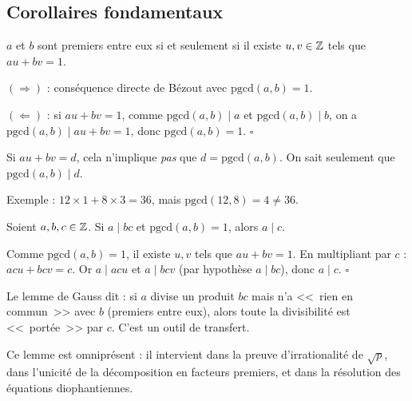 \subsection{Corollaires fondamentaux}

\begin{corollaire}
$a$ et $b$ sont premiers entre eux si et seulement si il existe $u, v \in \mathbb{Z}$ tels que $au + bv = 1$.
\end{corollaire}

\begin{proofbox}
$(\Rightarrow)$ : conséquence directe de Bézout avec $\text{pgcd}(a,b) = 1$.

$(\Leftarrow)$ : si $au + bv = 1$, comme $\text{pgcd}(a,b) \mid a$ et $\text{pgcd}(a,b) \mid b$, on a $\text{pgcd}(a,b) \mid au + bv = 1$, donc $\text{pgcd}(a,b) = 1$. \hfill$\square$
\end{proofbox}

\begin{rembox}
Si $au + bv = d$, cela n'implique \emph{pas} que $d = \text{pgcd}(a,b)$. On sait seulement que $\text{pgcd}(a,b) \mid d$.

Exemple : $12 \times 1 + 8 \times 3 = 36$, mais $\text{pgcd}(12, 8) = 4 \neq 36$.
\end{rembox}

\begin{thmbox}
Soient $a, b, c \in \mathbb{Z}$. Si $a \mid bc$ et $\text{pgcd}(a, b) = 1$, alors $a \mid c$.
\end{thmbox}

\begin{proofbox}
Comme $\text{pgcd}(a,b) = 1$, il existe $u, v$ tels que $au + bv = 1$. En multipliant par $c$ : $acu + bcv = c$. Or $a \mid acu$ et $a \mid bcv$ (par hypothèse $a \mid bc$), donc $a \mid c$. \hfill$\square$
\end{proofbox}

\begin{intuitionbox}
Le lemme de Gauss dit : si $a$ divise un produit $bc$ mais n'a <<~rien en commun~>> avec $b$ (premiers entre eux), alors toute la divisibilité est <<~portée~>> par $c$. C'est un outil de transfert.

Ce lemme est omniprésent : il intervient dans la preuve d'irrationalité de $\sqrt{p}$, dans l'unicité de la décomposition en facteurs premiers, et dans la résolution des équations diophantiennes.
\end{intuitionbox}


